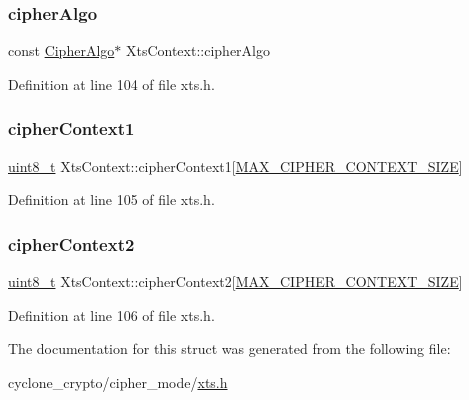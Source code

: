 \subsubsection{\texorpdfstring{cipher\+Algo}{cipherAlgo}}
{\footnotesize\ttfamily const \hyperlink{structCipherAlgo}{Cipher\+Algo}$\ast$ Xts\+Context\+::cipher\+Algo}



Definition at line 104 of file xts.\+h.

\mbox{\label{structXtsContext_a64bb7668459fbcd40d7f7915e9a79a97}} 
\subsubsection{\texorpdfstring{cipher\+Context1}{cipherContext1}}
{\footnotesize\ttfamily \hyperlink{stdint_8h_aba7bc1797add20fe3efdf37ced1182c5}{uint8\+\_\+t} Xts\+Context\+::cipher\+Context1\mbox{[}\hyperlink{cyclone__crypto_2core_2crypto_8h_a99fb8f5b5cc906fd435df00c1720f7ad}{M\+A\+X\+\_\+\+C\+I\+P\+H\+E\+R\+\_\+\+C\+O\+N\+T\+E\+X\+T\+\_\+\+S\+I\+ZE}\mbox{]}}



Definition at line 105 of file xts.\+h.

\mbox{\label{structXtsContext_afb74d825b35a35c34eff9ecbab9b49c4}} 
\subsubsection{\texorpdfstring{cipher\+Context2}{cipherContext2}}
{\footnotesize\ttfamily \hyperlink{stdint_8h_aba7bc1797add20fe3efdf37ced1182c5}{uint8\+\_\+t} Xts\+Context\+::cipher\+Context2\mbox{[}\hyperlink{cyclone__crypto_2core_2crypto_8h_a99fb8f5b5cc906fd435df00c1720f7ad}{M\+A\+X\+\_\+\+C\+I\+P\+H\+E\+R\+\_\+\+C\+O\+N\+T\+E\+X\+T\+\_\+\+S\+I\+ZE}\mbox{]}}



Definition at line 106 of file xts.\+h.



The documentation for this struct was generated from the following file\+:\begin{DoxyCompactItemize}
\item 
cyclone\+\_\+crypto/cipher\+\_\+mode/\hyperlink{xts_8h}{xts.\+h}\end{DoxyCompactItemize}
